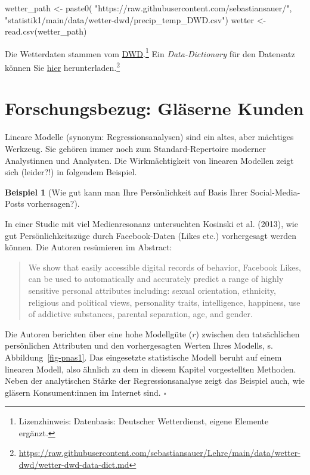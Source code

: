 \documentclass[
  letterpaper,
  twoside,
  open=any]{scrbook}
\newenvironment{Shaded}{\begin{snugshade}}{\end{snugshade}}
\newcommand{\FunctionTok}[1]{\textcolor[rgb]{0.28,0.35,0.67}{#1}}
\newcommand{\NormalTok}[1]{\textcolor[rgb]{0.00,0.23,0.31}{#1}}
\newcommand{\OtherTok}[1]{\textcolor[rgb]{0.00,0.23,0.31}{#1}}
\newcommand{\StringTok}[1]{\textcolor[rgb]{0.13,0.47,0.30}{#1}}
\theoremstyle{definition}
\theoremstyle{definition}
\newtheorem{example}{Beispiel}[chapter]
\theoremstyle{definition}
\theoremstyle{remark}
\begin{document}
\begin{Shaded}
\begin{Highlighting}[]
\NormalTok{wetter\_path }\OtherTok{\textless{}{-}} \FunctionTok{paste0}\NormalTok{(}
  \StringTok{"https://raw.githubusercontent.com/sebastiansauer/"}\NormalTok{,}
  \StringTok{"statistik1/main/data/wetter{-}dwd/precip\_temp\_DWD.csv"}\NormalTok{)}
\NormalTok{wetter }\OtherTok{\textless{}{-}} \FunctionTok{read.csv}\NormalTok{(wetter\_path)}
\end{Highlighting}
\end{Shaded}

Die Wetterdaten stammen vom
\href{https://opendata.dwd.de/}{DWD}.\footnote{Lizenzhinweis:
  Datenbasis: Deutscher Wetterdienst, eigene Elemente ergänzt.} Ein
\emph{Data-Dictionary} für den Datensatz können Sie
\href{https://raw.githubusercontent.com/sebastiansauer/Lehre/main/data/wetter-dwd/wetter-dwd-data-dict.md}{hier}
herunterladen.\footnote{\url{https://raw.githubusercontent.com/sebastiansauer/Lehre/main/data/wetter-dwd/wetter-dwd-data-dict.md}}

\section{Forschungsbezug: Gläserne
Kunden}\label{forschungsbezug-gluxe4serne-kunden}

Lineare Modelle (synonym: Regressionsanalysen) sind ein altes, aber
mächtiges Werkzeug. Sie gehören immer noch zum Standard-Repertoire
moderner Analystinnen und Analysten. Die Wirkmächtigkeit von linearen
Modellen zeigt sich (leider?!) in folgendem Beispiel.

\begin{example}[Wie gut kann man Ihre Persönlichkeit auf Basis Ihrer
Social-Media-Posts
vorhersagen?]\protect\hypertarget{exm-kosinski}{}\label{exm-kosinski}

In einer Studie mit viel Medienresonanz untersuchten Kosinski et al.
(2013), wie gut Persönlichkeitszüge durch Facebook-Daten (Likes etc.)
vorhergesagt werden können. Die Autoren resümieren im Abstract:

\begin{quote}
We show that easily accessible digital records of behavior, Facebook
Likes, can be used to automatically and accurately predict a range of
highly sensitive personal attributes including: sexual orientation,
ethnicity, religious and political views, personality traits,
intelligence, happiness, use of addictive substances, parental
separation, age, and gender.
\end{quote}

Die Autoren berichten über eine hohe Modellgüte (\(r\)) zwischen den
tatsächlichen persönlichen Attributen und den vorhergesagten Werten
Ihres Modells, s. Abbildung~\ref{fig-pnas1}. Das eingesetzte
statistische Modell beruht auf einem linearen Modell, also ähnlich zu
dem in diesem Kapitel vorgestellten Methoden. Neben der analytischen
Stärke der Regressionsanalyse zeigt das Beispiel auch, wie gläsern
Konsument:innen im Internet sind. \(\square\)

\end{example}
\end{document}

